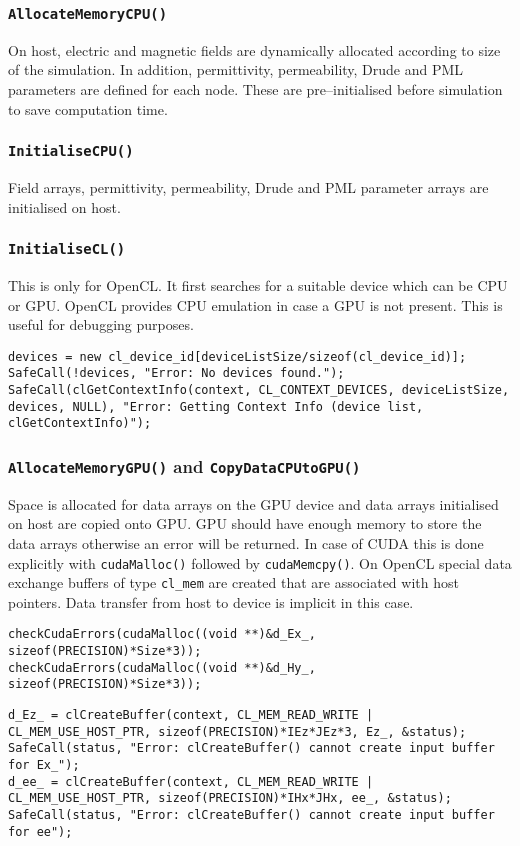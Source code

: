 \subsubsection{\texttt{AllocateMemoryCPU()}}
On host, electric and magnetic fields are dynamically allocated according to size of the simulation. In addition, permittivity, permeability, Drude and PML parameters are defined for each node. These are pre--initialised before simulation to save computation time.
\subsubsection{\texttt{InitialiseCPU()}}
Field arrays, permittivity, permeability, Drude and PML parameter arrays are initialised on host.
\subsubsection{\texttt{InitialiseCL()}}
This is only for OpenCL. It first searches for a suitable device which can be CPU or GPU. OpenCL provides CPU emulation in case a GPU is not present. This is useful for debugging purposes.
\label{lst:OpenCL-Device-Search}
\begin{lstlisting}[caption={Device selection in OpenCL}]
devices = new cl_device_id[deviceListSize/sizeof(cl_device_id)];
SafeCall(!devices, "Error: No devices found.");
SafeCall(clGetContextInfo(context, CL_CONTEXT_DEVICES, deviceListSize, devices, NULL), "Error: Getting Context Info (device list, clGetContextInfo)");
\end{lstlisting}
\subsubsection{\texttt{AllocateMemoryGPU()} and \texttt{CopyDataCPUtoGPU()}}
Space is allocated for data arrays on the GPU device and data arrays initialised on host are copied onto GPU. GPU should have enough memory to store the data arrays otherwise an error will be returned. In case of CUDA this is done explicitly with \texttt{cudaMalloc()} followed by \texttt{cudaMemcpy()}. On OpenCL special data exchange buffers of type \verb|cl_mem| are created that are associated with host pointers. Data transfer from host to device is implicit in this case.
\label{lst:CUDA-Host-Memory-Allocation}
\begin{lstlisting}[caption={Device memory allocation in CUDA}]
checkCudaErrors(cudaMalloc((void **)&d_Ex_, sizeof(PRECISION)*Size*3));
checkCudaErrors(cudaMalloc((void **)&d_Hy_, sizeof(PRECISION)*Size*3));
\end{lstlisting}
\label{lst:OpenCL-Device-Memory-Buffers}
\begin{lstlisting}[caption={Device memory allocation in OpenCL}]
d_Ez_ = clCreateBuffer(context, CL_MEM_READ_WRITE | CL_MEM_USE_HOST_PTR, sizeof(PRECISION)*IEz*JEz*3, Ez_, &status);
SafeCall(status, "Error: clCreateBuffer() cannot create input buffer for Ex_");
d_ee_ = clCreateBuffer(context, CL_MEM_READ_WRITE | CL_MEM_USE_HOST_PTR, sizeof(PRECISION)*IHx*JHx, ee_, &status);
SafeCall(status, "Error: clCreateBuffer() cannot create input buffer for ee");
\end{lstlisting}
